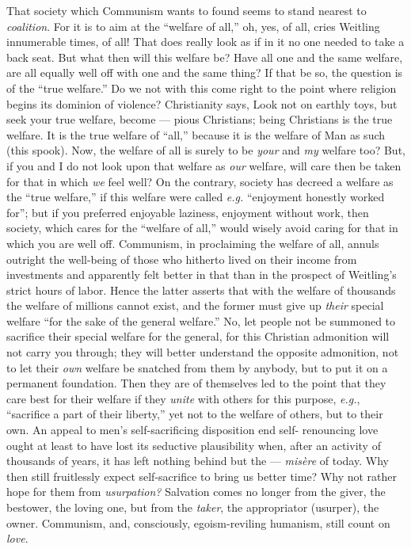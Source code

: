That society which Communism wants to found seems to stand nearest to 
\textit{coalition}. For it is to aim at the ``welfare of all,'' oh, yes, of 
all, cries Weitling innumerable times, of all! That does really look as if in 
it no one needed to take a back seat. But what then will this welfare be? Have 
all one and the same welfare, are all equally well off with one and the same 
thing? If that be so, the question is of the ``true welfare.'' Do we not 
with this come right to the point where religion begins its dominion of 
violence? Christianity says, Look not on earthly toys, but seek your true 
welfare, become --- pious Christians; being Christians is the true welfare. It 
is the true welfare of ``all,'' because it is the welfare of Man as such 
(this spook). Now, the welfare of all is surely to be \textit{your} and 
\textit{my} welfare too? But, if you and I do not look upon that welfare as 
\textit{our} welfare, will care then be taken for that in which \textit{we} 
feel well? On the contrary, society has decreed a welfare as the ``true 
welfare,'' if this welfare were called \textit{e.g.} ``enjoyment honestly 
worked for''; but if you preferred enjoyable laziness, enjoyment without 
work, then society, which cares for the ``welfare of all,'' would wisely 
avoid caring for that in which you are well off. Communism, in proclaiming the 
welfare of all, annuls outright the well-being of those who hitherto lived on 
their income from investments and apparently felt better in that than in the 
prospect of Weitling's strict hours of labor. Hence the latter asserts that 
with the welfare of thousands the welfare of millions cannot exist, and the 
former must give up \textit{their} special welfare ``for the sake of the 
general welfare.'' No, let people not be summoned to sacrifice their special 
welfare for the general, for this Christian admonition will not carry you 
through; they will better understand the opposite admonition, not to let their 
\textit{own} welfare be snatched from them by anybody, but to put it on a 
permanent foundation. Then they are of themselves led to the point that they 
care best for their welfare if they \textit{unite} with others for this 
purpose, \textit{e.g.}, ``sacrifice a part of their liberty,'' yet not to 
the welfare of others, but to their own. An appeal to men's self-sacrificing 
disposition end self- renouncing love ought at least to have lost its 
seductive plausibility when, after an activity of thousands of years, it has 
left nothing behind but the --- \textit{mis\`ere} of today. Why then still 
fruitlessly expect self-sacrifice to bring us better time? Why not rather hope 
for them from \textit{usurpation?} Salvation comes no longer from the giver, 
the bestower, the loving one, but from the \textit{taker}, the appropriator 
(usurper), the owner. Communism, and, consciously, egoism-reviling humanism, 
still count on \textit{love}.

